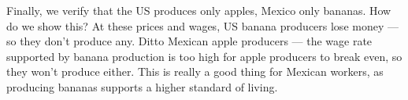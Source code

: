 \begin{comment}
If we're wrong, we'll find out shortly. We'll guess the following
prices and show that they work: set $w = 1$ for the US and
\begin{eqnarray*}
    p_{a} &=& 0.05 \\
    p_{b} &=& ({4}/{3}) p_{a} \;=\; 0.0667 \\
    q &=& {4}/{3}
\end{eqnarray*}
for both countries (since there's trade, any other prices in
Mexico would lead to an arbitrage opportunity).  At these prices,
the US will produce $L_{1} \alpha = 100\times 20 = 2,000$ apples
and consume $a = {sY}/{p_{a}} = 1,500$ and $b =
{(1-s)Y}/{p_{b}} = 375$. The total level of utility is 1,061.

What about Mexico?  At these prices, Mexico produces only bananas,
as we guessed.  Total production is $L_{2}\beta = 500$ bananas.
The Mexican wage rate solves $p_{b}\beta = w$ or $w = 0.067\times
5 = 0.33$. (Why is the wage lower than in the US?  Because productivity
is lower.) Mexican income is therefore $Y = wN = 33.3$.
Consumption is $a = 500$ and $b = 125$. Utility is 353.6.



{\it The remainder of this section works through the
solution in greater detail.
It's only for people who want to see where all the pieces come from.
Strangely enough, there generally are some people like this,
but if you're not one of them go immediately to the next section.\/}

We can find the equilibrium by looking at the supply and demand
for apples.
We'll assume for now that the US produces only apples,
Mexico only bananas.
We'll verify this later.
If that's the case, then output of apples is the amount of labor in
the US times apple productivity:
\[
    \mbox{Supply of Apples}  \;=\;  L_1 \alpha_1
                \;=\; 100 \times 20 \;=\; 2000.
\]
What about demand?  We need demand by both countries.
Since each country spends a fraction $s$ on apples,
demand is
\[
    \mbox{Demand for Apples}  \;=\;  s Y_1/p_a + s Y_2/p_a .
\]
Note that US income is $ Y_1 = w_1 L_1 $.
\end{comment}



Finally, we verify that the US produces only apples, Mexico only
bananas.
How do we show this?
At these prices and wages,
US banana producers lose money --- so they don't produce any.
Ditto Mexican apple producers --- the wage rate supported by banana
production is too high for apple producers to break even,
so they won't produce either.
This is really a good thing for Mexican workers, as
producing bananas supports a higher standard of living.

